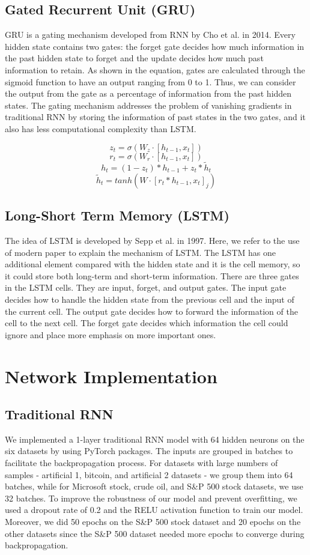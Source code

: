 \documentclass[letterpaper, 10 pt, conference]{ieeeconf}  %
\begin{document}
    \subsection{Gated Recurrent Unit (GRU)}
        GRU is a gating mechanism developed from RNN by Cho et al. in 2014. Every hidden state contains two gates: the forget gate decides how much information in the past hidden state to forget and the update decides how much past information to retain. As shown in the equation, gates are calculated through the sigmoid function to have an output ranging from 0 to 1. Thus, we can consider the output from the gate as a percentage of information from the past hidden states. The gating mechanism addresses the problem of vanishing gradients in traditional RNN by storing the information of past states in the two gates, and it also has less computational complexity than LSTM.

        $$ z_t = \sigma(W_z \cdot [h_{t-1},x_t])$$
        $$ r_t = \sigma(W_r \cdot [h_{t-1},x_t])$$
        $$ h_t = (1-z_t) \ast h_{t-1} + z_t \ast \tilde{h}_t$$
        $$ \tilde h_t = tanh(W \cdot [r_t \ast h_{t-1}, x_t]_j)$$

    \subsection{Long-Short Term Memory (LSTM)}
        The idea of LSTM is developed by Sepp et al. in 1997. Here, we refer to the use of modern paper to explain the mechanism of LSTM. The LSTM has one additional element compared with the hidden state and it is the cell memory, so it could store both long-term and short-term information. There are three gates in the LSTM cells. They are input, forget, and output gates. The input gate decides how to handle the hidden state from the previous cell and the input of the current cell. The output gate decides how to forward the information of the cell to the next cell. The forget gate decides which information the cell could ignore and place more emphasis on more important ones. 

\section{Network Implementation}
    \subsection{Traditional RNN}
        We implemented a 1-layer traditional RNN model with 64 hidden neurons on the six datasets by using PyTorch packages. The inputs are grouped in batches to facilitate the backpropagation process. For datasets with large numbers of samples - artificial 1, bitcoin, and artificial 2 datasets - we group them into 64 batches, while for Microsoft stock, crude oil, and S\&P 500 stock datasets, we use 32 batches. To improve the robustness of our model and prevent overfitting, we used a dropout rate of 0.2 and the RELU activation function to train our model. Moreover, we did 50 epochs on the S\&P 500 stock dataset and 20 epochs on the other datasets since the S\&P 500 dataset needed more epochs to converge during backpropagation. 
\end{document}

